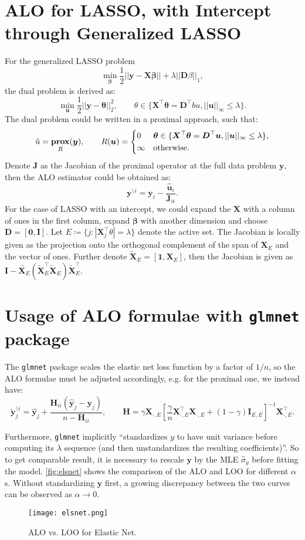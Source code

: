 \documentclass[11pt]{article}
\newcommand{\bu}{\bm{u}}
\newcommand{\by}{\bm{y}}
\newcommand{\bD}{\bm{D}}
\newcommand{\bH}{\bm{H}}
\newcommand{\bI}{\bm{I}}
\newcommand{\bJ}{\bm{J}}
\newcommand{\bX}{\bm{X}}
\newcommand{\bbeta}{\bm{\beta}}
\newcommand{\btheta}{\bm{\theta}}
\DeclareMathOperator{\bprox}{\mathbf{prox}}
\begin{document}
\section{ALO for LASSO, with Intercept through Generalized LASSO}
For the generalized LASSO problem \[\min\limits_{\bbeta}\frac{1}{2}||\by-\bX\bbeta||+\lambda||\bD\beta||_{1},\] the dual problem is derived as: \[\min\limits_{\bu}\frac{1}{2}||\by-\btheta||_{2}^{2},\qquad\theta\in \{\bX^{\top}\btheta = \bD^{\top}bu, ||\bu||_{\infty} \leq \lambda\}.\] The dual problem could be written in a proximal approach, such that: \[\hat{u} = \bprox_{R}(\by),\qquad R(\bu) =\begin{dcases}
0 & \btheta \in \{\bX^{\top}\btheta = \bD^{\top}\bu, ||\bu||_{\infty} \leq \lambda\},\\
\infty & \text{otherwise.}
\end{dcases}\] Denote $\bJ$ as the Jacobian of the proximal operator at the full data problem $\by$, then the ALO estimator could be obtained as: \[\by^{\setminus i} = \by_{i} - \frac{\hat{\bu}_{i}}{\bJ_{ii}}.\] For the case of LASSO with an intercept, we could expand the $\bX$ with a column of ones in the first column, expand $\bbeta$ with another dimension and choose $\bD = [\bm{0}, \bI]$. Let \(E\coloneqq\{j:|\bX_{j}^{\top}\theta| = \lambda \}\) denote the active set. The Jacobian is locally given as the projection onto the orthogonal complement of the span of $\bX_{E}$ and the vector of ones. Further denote $\tilde{\bX}_{E} = [\textbf{1}, \bX_{E}]$, then the Jacobian is given as $\bI - \tilde{\bX_{E}}(\tilde{\bX}_{E}^{\top}\tilde{\bX}_{E})\tilde{\bX}_{E}^{\top}$.

\section{Usage of ALO formulae with \texttt{glmnet} package}
The \verb|glmnet| package scales the elastic net loss function by a factor of \(1/n\), so the ALO formulae must be adjusted accordingly, e.g. for the proximal one, we instead have: \[\tilde{\by}_j^{\setminus i}=\hat{\by}_j+\frac{\bH_{ii}(\hat{\by}_j-\by_j)}{n-\bH_{ii}},\qquad\bH=\gamma\bX_{\cdot,E}\left[\frac{\gamma}{n}\bX_{\cdot,E}^\top\bX_{\cdot,E}+\left(1-\gamma\right)\bI_{E,E}\right]^{-1}\bX_{\cdot,E}^\top.\]

Furthermore, \verb|glmnet| implicitly ``standardizes \(y\) to have unit variance before computing its \(\lambda\) sequence (and then unstandardizes the resulting coefficients)''. So to get comparable result, it is necessary to rescale \(\by\) by the MLE \(\hat{\sigma}_y\) before fitting the model. \autoref{fig:elsnet} shows the comparison of the ALO and LOO for different \(\alpha\)s. Without standardizing \(\by\) first, a growing discrepancy between the two curves can be observed as \(\alpha\to0\).
	\begin{figure}[H]
		\centering
		\texttt{[image: elsnet.png]}
		\caption{ALO vs. LOO for Elastic Net. \label{fig:elsnet}}
	\end{figure}
\end{document}
